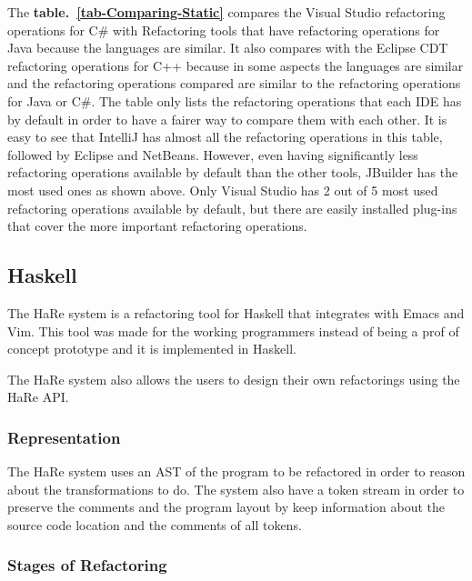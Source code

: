 The {\bf table.~\ref{tab-Comparing-Static}} compares the Visual Studio refactoring operations for C\# with Refactoring tools that have refactoring operations for Java because the languages are similar. It also compares with the Eclipse CDT  refactoring operations for C++ because in some aspects the languages are similar and the refactoring operations compared are similar to the refactoring operations for Java or C\#. 
The table only lists the refactoring operations that each IDE has by default in order to have a fairer way to compare them with each other.
It is easy to see that IntelliJ has almost all the refactoring operations in this table, followed by Eclipse and NetBeans.
However, even having significantly less refactoring operations available by default than the other tools, JBuilder has the most used ones as shown above.
Only Visual Studio has 2 out of 5 most used refactoring operations available by default, but there are easily installed plug-ins that cover the more important refactoring operations. 



\subsection{Haskell}

The HaRe system is a refactoring tool for Haskell that integrates with Emacs and Vim.
This tool was made for the working programmers instead of being a prof of concept prototype and it is implemented in Haskell.

The HaRe system also allows the users to design their own refactorings using the HaRe API.

\subsubsection{Representation}
\hfill \break

The HaRe \cite{thompson2005refactoring} system uses an AST of the program to be refactored in order to reason about the transformations to do.
The system also have a token stream in order to preserve the comments and the program layout by keep information about the source code location and the comments of all tokens.

\subsubsection{Stages of Refactoring}
\hfill \break


